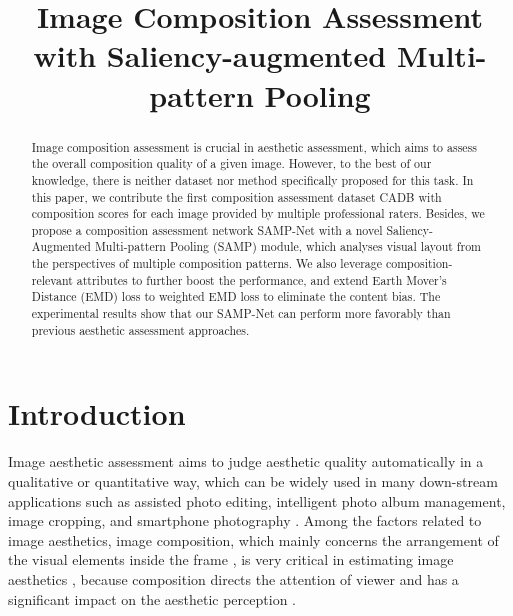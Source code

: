 \documentclass{bmvc2k}
\title{Image Composition Assessment with Saliency-augmented Multi-pattern Pooling}
\begin{document}
\maketitle
\begin{abstract}
Image composition assessment is crucial in aesthetic assessment, which aims to assess the overall composition quality of a given image. However, to the best of our knowledge, there is neither dataset nor method specifically proposed for this task. In this paper, we contribute the first composition assessment dataset CADB with composition scores for each image provided by multiple professional raters. Besides, we propose a composition assessment network SAMP-Net with a novel Saliency-Augmented Multi-pattern Pooling (SAMP) module, which analyses visual layout from the perspectives of multiple composition patterns. We also leverage composition-relevant attributes to further boost the performance, and extend Earth Mover's Distance (EMD) loss to weighted EMD loss to eliminate the content bias. The experimental results show that our SAMP-Net can perform more favorably than previous aesthetic assessment approaches.
\end{abstract}


\section{Introduction}
\label{sec:intro}
Image aesthetic assessment aims to judge aesthetic quality automatically in a qualitative or quantitative way, which can be widely used in many down-stream applications such as assisted photo editing, intelligent photo album management, image cropping, and smartphone photography \cite{Bhattacharya2011AHA,Chen2017LearningTC,Datta2006StudyingAI,rawat2015context,fang2020perceptual,tu2020image,rawat2017spring,rawat2016clicksmart}. 
Among the factors related to image aesthetics, image composition, which mainly concerns the arrangement of the visual elements inside the frame \cite{Prakel2010TheFO}, is very critical in estimating image aesthetics \cite{savakis2000evaluation,obrador2010role,Liu2020CompositionAwareIA}, because composition directs the attention of viewer and has a significant impact on the aesthetic perception \cite{Prakel2010TheFO,Freeman2007ThePE,Martnez1988VisualFA}. 
\end{document}
